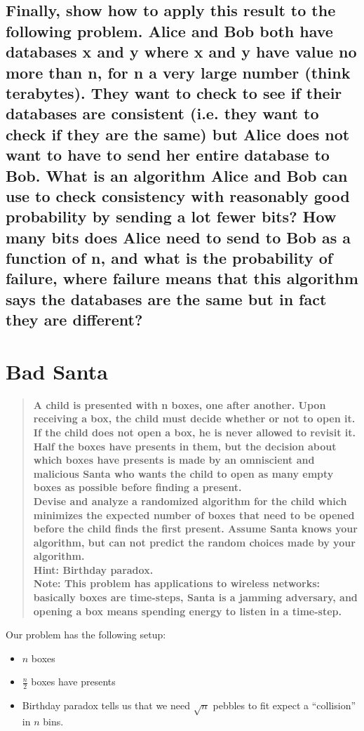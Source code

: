 \documentclass[titlepage]{article}\usepackage[]{graphicx}\usepackage[]{color}
\begin{document}
\subsection{ Finally, show how to apply this result to the following problem. Alice and
Bob both have databases x and y where x and y have value no more than n, for n
a very large number (think terabytes). They want to check to see if their
databases are consistent (i.e. they want to check if they are the same) but
Alice does not want to have to send her entire database to Bob. What is an
algorithm Alice and Bob can use to check consistency with reasonably good
probability by sending a lot fewer bits? How many bits does Alice need to send
to Bob as a function of n, and what is the probability of failure, where
failure means that this algorithm says the databases are the same but in fact
they are different? }


\section{Bad Santa }
\begin{quote}
	\textbf{
		A child is presented with n boxes, one after another. Upon receiving
		a box, the child must decide whether or not to open it. If the child does not
		open a box, he is never allowed to revisit it. Half the
		boxes have presents in them, but the decision about which boxes have presents
		is made by an omniscient and malicious Santa who wants the child to open as
		many empty boxes as possible before finding a present. \\ 
		Devise and analyze a randomized algorithm for the child which minimizes the
		expected number of boxes that need to be opened before the child finds the
		first present. Assume Santa knows your algorithm, but can not predict the
		random choices made by your algorithm. \\ 
		Hint: Birthday paradox. \\
		Note: This problem has applications to wireless networks: basically boxes are
		time-steps, Santa is a jamming adversary, and opening a box means spending
	energy to listen in a time-step.}
\end{quote}

Our problem has the following setup:

\begin{itemize}
	\item $n$ boxes
	\item $\frac{n}{2}$ boxes have presents
	\item Birthday paradox tells us that we need $\sqrt{n}$ pebbles to fit
		expect a ``collision'' in $n$ bins. 
\end{itemize}
\end{document}

